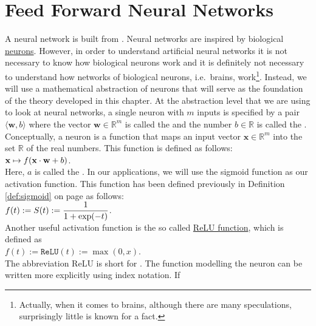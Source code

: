 \section{Feed Forward Neural Networks}
A neural network is built from .  Neural networks are inspired by biological 
\href{https://en.wikipedia.org/wiki/Neuron}{neurons}.  However, in order to understand artificial neural
networks it is not necessary to know how biological neurons work and it is definitely not necessary to
understand how networks of biological neurons, i.e.~brains, work\footnote{
  Actually, when it comes to brains, although there are many speculations, surprisingly little is known for a fact.  
}.  
Instead, we will use a mathematical abstraction of neurons that will serve as the foundation of the theory
developed in this chapter.  At the abstraction level that we are using to look at neural networks, a single neuron
with $m$ inputs is specified by a pair $\langle \mathbf{w}, b\rangle$ where the vector $\mathbf{w} \in \mathbb{R}^m$ is called the  and 
the number $b \in \mathbb{R}$ is called the .   
Conceptually, a neuron is a function that maps an input vector $\mathbf{x} \in \mathbb{R}^m$ into the set
$\mathbb{R}$ of the real numbers.  This function is defined as follows: 
\\[0.2cm]
\hspace*{1.3cm}
$\displaystyle \mathbf{x} \mapsto f(\mathbf{x} \cdot \mathbf{w} + b)$.
\\[0.2cm]
Here, $a$ is called the .   In our applications, we will
use the sigmoid function as our activation function.  This function has been defined previously in Definition
\ref{def:sigmoid} on page \pageref{def:sigmoid} as follows:
\\[0.2cm]
\hspace*{1.3cm}
$\displaystyle f(t) := S(t) := \frac{1}{1 + \exp(-t)}$.
\\[0.2cm]
Another useful activation function is the so called
\href{https://en.wikipedia.org/wiki/Rectifier_(neural_networks)}{ReLU function}, 
which is defined as 
\\[0.2cm]
\hspace*{1.3cm}
$f(t) := \mathtt{ReLU}(t) := \max(0, x)$.
\\[0.2cm]
The abbreviation ReLU is short for . 
The function modelling the neuron can be written more explicitly using index notation.  If
\\[0.2cm]
